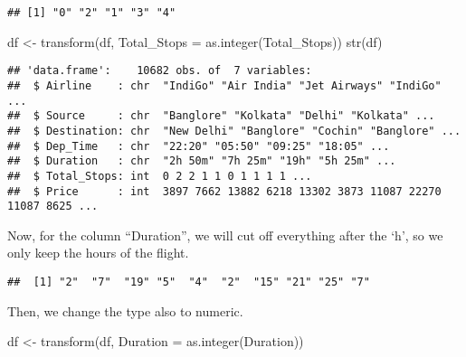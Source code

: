 \documentclass[
]{article}
\newenvironment{Shaded}{\begin{snugshade}}{\end{snugshade}}
\newcommand{\AttributeTok}[1]{\textcolor[rgb]{0.77,0.63,0.00}{#1}}
\newcommand{\DecValTok}[1]{\textcolor[rgb]{0.00,0.00,0.81}{#1}}
\newcommand{\FunctionTok}[1]{\textcolor[rgb]{0.00,0.00,0.00}{#1}}
\newcommand{\NormalTok}[1]{#1}
\newcommand{\OtherTok}[1]{\textcolor[rgb]{0.56,0.35,0.01}{#1}}
\newcommand{\SpecialCharTok}[1]{\textcolor[rgb]{0.00,0.00,0.00}{#1}}
\newcommand{\StringTok}[1]{\textcolor[rgb]{0.31,0.60,0.02}{#1}}
\begin{document}
\begin{verbatim}
## [1] "0" "2" "1" "3" "4"
\end{verbatim}

\begin{Shaded}
\begin{Highlighting}[]
\NormalTok{df }\OtherTok{\textless{}{-}} \FunctionTok{transform}\NormalTok{(df, }\AttributeTok{Total\_Stops =} \FunctionTok{as.integer}\NormalTok{(Total\_Stops))}
\FunctionTok{str}\NormalTok{(df)}
\end{Highlighting}
\end{Shaded}

\begin{verbatim}
## 'data.frame':    10682 obs. of  7 variables:
##  $ Airline    : chr  "IndiGo" "Air India" "Jet Airways" "IndiGo" ...
##  $ Source     : chr  "Banglore" "Kolkata" "Delhi" "Kolkata" ...
##  $ Destination: chr  "New Delhi" "Banglore" "Cochin" "Banglore" ...
##  $ Dep_Time   : chr  "22:20" "05:50" "09:25" "18:05" ...
##  $ Duration   : chr  "2h 50m" "7h 25m" "19h" "5h 25m" ...
##  $ Total_Stops: int  0 2 2 1 1 0 1 1 1 1 ...
##  $ Price      : int  3897 7662 13882 6218 13302 3873 11087 22270 11087 8625 ...
\end{verbatim}

Now, for the column ``Duration'', we will cut off everything after the
`h', so we only keep the hours of the flight.

\begin{Shaded}
\end{Shaded}

\begin{verbatim}
##  [1] "2"  "7"  "19" "5"  "4"  "2"  "15" "21" "25" "7"
\end{verbatim}

Then, we change the type also to numeric.

\begin{Shaded}
\begin{Highlighting}[]
\NormalTok{df }\OtherTok{\textless{}{-}} \FunctionTok{transform}\NormalTok{(df, }\AttributeTok{Duration =} \FunctionTok{as.integer}\NormalTok{(Duration))}
\end{Highlighting}
\end{Shaded}
\end{document}
